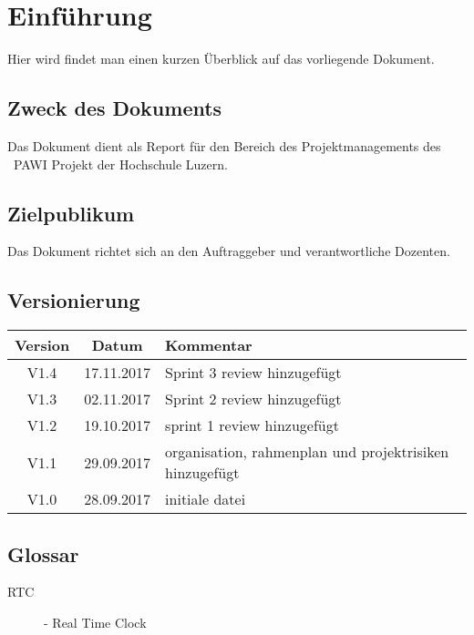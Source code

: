 \section{Einführung}
    Hier wird findet man einen kurzen Überblick auf das vorliegende Dokument.
	\subsection{Zweck des Dokuments}
    Das Dokument dient als Report für den Bereich des Projektmanagements des \documenttitle\ PAWI Projekt der Hochschule Luzern.
	\subsection{Zielpublikum}
    Das Dokument richtet sich an den Auftraggeber und verantwortliche Dozenten.
	\subsection{Versionierung}
		\begin{table}[h]
			\centering
			\begin{tabularx}{\textwidth}{|c|c|X|}
			\hline
			\rowcolor{shadecolor}\textbf{Version} & \textbf{Datum} & \textbf{Kommentar}\\ \hline
            V1.4 & 17.11.2017 & Sprint 3 review hinzugefügt\\
            V1.3 & 02.11.2017 & Sprint 2 review hinzugefügt\\
            V1.2 & 19.10.2017 & sprint 1 review hinzugefügt\\
            V1.1 & 29.09.2017 & organisation, rahmenplan und projektrisiken hinzugefügt\\
			V1.0 & 28.09.2017 & initiale datei \\ \hline
			\end{tabularx}
		\end{table}
	\subsection{Glossar}
		\begin{description}
			\item[RTC]- Real Time Clock
		\end{description}